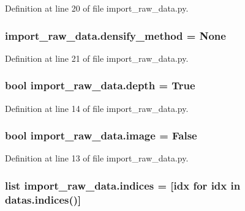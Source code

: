 Definition at line 20 of file import\+\_\+raw\+\_\+data.\+py.

\subsubsection[{\texorpdfstring{densify\+\_\+method}{densify_method}}]{\setlength{\rightskip}{0pt plus 5cm}import\+\_\+raw\+\_\+data.\+densify\+\_\+method = None}\hypertarget{namespaceimport__raw__data_a445f668e0123591aff14f9040569aadf}{}\label{namespaceimport__raw__data_a445f668e0123591aff14f9040569aadf}


Definition at line 21 of file import\+\_\+raw\+\_\+data.\+py.

\subsubsection[{\texorpdfstring{depth}{depth}}]{\setlength{\rightskip}{0pt plus 5cm}bool import\+\_\+raw\+\_\+data.\+depth = True}\hypertarget{namespaceimport__raw__data_a8aafa011468e4613de70cabbe8c35d1d}{}\label{namespaceimport__raw__data_a8aafa011468e4613de70cabbe8c35d1d}


Definition at line 14 of file import\+\_\+raw\+\_\+data.\+py.

\subsubsection[{\texorpdfstring{image}{image}}]{\setlength{\rightskip}{0pt plus 5cm}bool import\+\_\+raw\+\_\+data.\+image = False}\hypertarget{namespaceimport__raw__data_a509321ee90c3121a01a8a2171e576a79}{}\label{namespaceimport__raw__data_a509321ee90c3121a01a8a2171e576a79}


Definition at line 13 of file import\+\_\+raw\+\_\+data.\+py.

\subsubsection[{\texorpdfstring{indices}{indices}}]{\setlength{\rightskip}{0pt plus 5cm}list import\+\_\+raw\+\_\+data.\+indices = \mbox{[}idx for idx in datas.\+indices()\mbox{]}}\hypertarget{namespaceimport__raw__data_a0057f7e5cd87a2fb6fdeeb6d5e8bed7c}{}\label{namespaceimport__raw__data_a0057f7e5cd87a2fb6fdeeb6d5e8bed7c}


